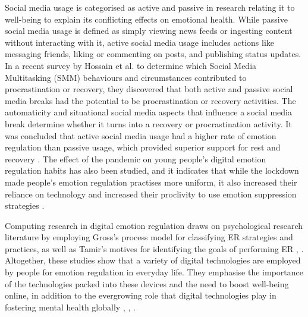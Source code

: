 Social media usage is categorised as active and passive in research relating it to well-being to explain its conflicting effects on emotional health. While passive social media usage is defined as simply viewing news feeds or ingesting content without interacting with it, active social media usage includes actions like messaging friends, liking or commenting on posts, and publishing status updates. In a recent survey by Hossain et al. to determine which Social Media Multitasking (SMM) behaviours and circumstances contributed to procrastination or recovery, they discovered that both active and passive social media breaks had the potential to be procrastination or recovery activities. The automaticity and situational social media aspects that influence a social media break determine whether it turns into a recovery or procrastination activity. It was concluded that active social media usage had a higher rate of emotion regulation than passive usage, which provided superior support for rest and recovery \cite{hossain2022motivational}. The effect of the pandemic on young people's digital emotion regulation habits has also been studied, and it indicates that while the lockdown made people's emotion regulation practises more uniform, it also increased their reliance on technology and increased their proclivity to use emotion suppression strategies \cite{tag2022impact}.


Computing research in digital emotion regulation draws on psychological research literature by employing Gross's process model for classifying ER strategies and practices, as well as Tamir's motives for identifying the goals of performing ER \cite{slovak2022designing}, \cite{wadley2020digital}. 
Altogether, these studies show that a variety of digital technologies are employed by people for emotion regulation in everyday life. They emphasise the importance of the technologies packed into these devices and the need to boost well-being online, in addition to the evergrowing role that digital technologies play in fostering mental health globally \cite{slovak2022designing}, \cite{wadley2020digital}, \cite{smith2022digital}.

  
  
  
  
